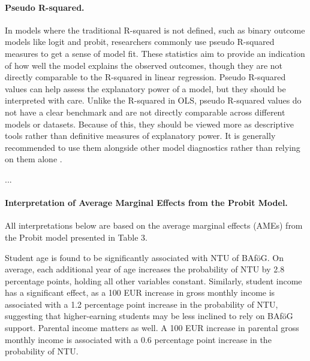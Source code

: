 \paragraph{Pseudo R-squared.} In models where the traditional R-squared is not defined, such as binary outcome models like logit and probit, researchers commonly use pseudo R-squared measures to get a sense of model fit. These statistics aim to provide an indication of how well the model explains the observed outcomes, though they are not directly comparable to the R-squared in linear regression. Pseudo R-squared values can help assess the explanatory power of a model, but they should be interpreted with care. Unlike the R-squared in OLS, pseudo R-squared values do not have a clear benchmark and are not directly comparable across different models or datasets. Because of this, they should be viewed more as descriptive tools rather than definitive measures of explanatory power. It is generally recommended to use them alongside other model diagnostics rather than relying on them alone \citep{ozili_acceptable_2023}.






...

\paragraph{Interpretation of Average Marginal Effects from the Probit Model.} All interpretations below are based on the average marginal effects (AMEs) from the Probit model presented in Table 3.

Student age is found to be significantly associated with NTU of BAföG. 
On average, each additional year of age increases the probability of NTU by 2.8 percentage points, holding all other variables constant. 
Similarly, student income has a significant effect, as a 100 EUR increase in gross monthly income is associated with a 1.2 percentage point increase in the probability of NTU, suggesting that higher-earning students may be less inclined to rely on BAföG support. 
Parental income matters as well. A 100 EUR increase in parental gross monthly income is associated with a 0.6 percentage point increase in the probability of NTU. 

